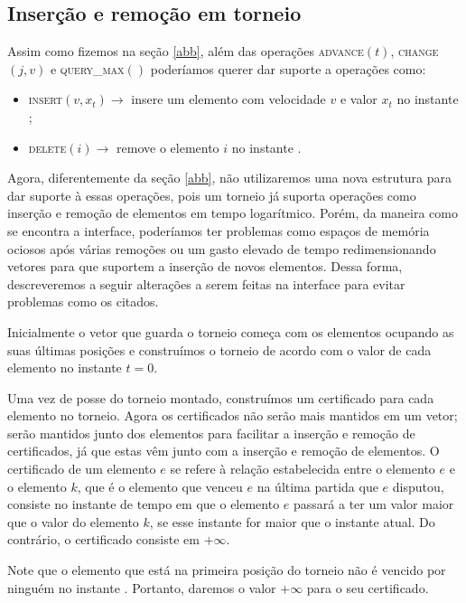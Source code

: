 
\FloatBarrier
\subsection{Inserção e remoção em torneio} \label{trni:secao}

Assim como fizemos na seção \ref{abb}, além das operações
\textsc{advance}$(t)$, \textsc{change}$(j, v)$ e
\textsc{query\_max}$()$ poderíamos querer dar suporte a operações
como:

\begin{itemize}
    \item \textsc{insert}$(v, x_t)\rightarrow$ insere um elemento
    com velocidade $v$ e valor $x_t$ no instante \now;
    \item \textsc{delete}$(i) \rightarrow$ remove o elemento $i$ no
    instante \now.
\end{itemize}
Agora, diferentemente da seção \ref{abb}, não utilizaremos uma nova
estrutura para dar suporte à essas operações, pois um torneio já
suporta operações como inserção e remoção de elementos em tempo
logarítmico. Porém, da maneira como se encontra a interface,
poderíamos ter problemas como espaços de memória ociosos após várias
remoções ou um gasto elevado de tempo redimensionando vetores para
que suportem a inserção de novos elementos. Dessa forma,
descreveremos a seguir alterações a serem feitas na interface para
evitar problemas como os citados.

Inicialmente o vetor que guarda o torneio começa com os elementos
ocupando as suas últimas posições e construímos o torneio de acordo
com o valor de cada elemento no instante $t = 0$.

Uma vez de posse do torneio montado, construímos um certificado para
cada elemento no torneio. Agora os certificados não serão mais
mantidos em um vetor; serão mantidos junto dos elementos para
facilitar a inserção e remoção de certificados, já que estas vêm
junto com a inserção e remoção de elementos. O certificado de um
elemento $e$ se refere à relação estabelecida entre o elemento $e$ e
o elemento $k$, que é o elemento que venceu $e$ na última partida
que $e$ disputou, consiste no instante de tempo em que o elemento
$e$ passará a ter um valor maior que o valor do elemento $k$, se
esse instante for maior que o instante atual. Do contrário, o
certificado consiste em $+\infty$.

Note que o elemento que está na primeira posição do torneio não é
vencido por ninguém no instante \now. Portanto, daremos o valor
$+\infty$ para o seu certificado.

